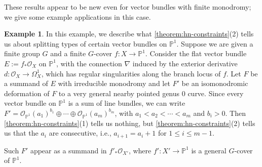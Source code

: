 \documentclass[12 pt]{amsart}
\theoremstyle{plain}
\theoremstyle{definition}
\newtheorem{example}[subsubsection]{Example}
\theoremstyle{remark}
\numberwithin{equation}{section}
\begin{document}
These results appear to be new even for vector bundles with finite monodromy; we give some example applications in this case.
\begin{example}
	\label{example:splitting-type}
	In this example, we describe what 
	\autoref{theorem:hn-constraints}(2) tells us about splitting types
	of certain vector bundles on $\mathbb P^1$.
	Suppose we are given a finite group $G$ and
	a finite $G$-cover $f: X \to \mathbb P^1$.
	Consider the flat vector bundle $E := f_* \mathscr O_X$ on $\mathbb P^1$, with the connection $\nabla$ induced by the exterior derivative $d: \mathscr{O}_X\to \Omega^1_X$,
	which has regular singularities along the branch locus of $f$.
	Let $F$ be a summand of $E$ with irreducible monodromy
	and let $F'$ be an isomonodromic deformation of $F$ to a very general
	nearby pointed genus $0$ curve.
	Since every vector bundle on $\mathbb P^1$ is a sum of line bundles,
	we can write $F' = \mathscr O_{\mathbb P^1}(a_1)^{b_1} \oplus \cdots
	\oplus \mathscr O_{\mathbb P^1}(a_m)^{b_m}$,
	with $a_1 < a_2 < \cdots < a_m$ and $b_i > 0$.
	Then \autoref{theorem:hn-constraints}(1) tells us nothing, but
	\autoref{theorem:hn-constraints}(2) tells us that the $a_i$ are
	consecutive, i.e., $a_{i + 1} = a_i + 1$ for $1 \leq i \leq m-1$.

	Such $F'$ appear as a summand in $f'_* \mathscr O_{X'}$, where $f': X'
	\to \mathbb P^1$ is a general $G$-cover of $\mathbb P^1$.
\end{example}
\end{document}

